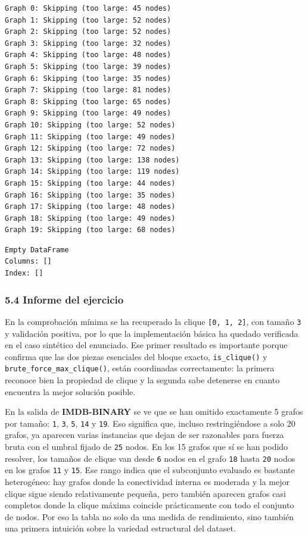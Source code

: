 \documentclass[11pt]{article}
\begin{document}
    \begin{Verbatim}[commandchars=\\\{\}]
Graph 0: Skipping (too large: 45 nodes)
Graph 1: Skipping (too large: 52 nodes)
Graph 2: Skipping (too large: 52 nodes)
Graph 3: Skipping (too large: 32 nodes)
Graph 4: Skipping (too large: 48 nodes)
Graph 5: Skipping (too large: 39 nodes)
Graph 6: Skipping (too large: 35 nodes)
Graph 7: Skipping (too large: 81 nodes)
Graph 8: Skipping (too large: 65 nodes)
Graph 9: Skipping (too large: 49 nodes)
Graph 10: Skipping (too large: 52 nodes)
Graph 11: Skipping (too large: 49 nodes)
Graph 12: Skipping (too large: 72 nodes)
Graph 13: Skipping (too large: 138 nodes)
Graph 14: Skipping (too large: 119 nodes)
Graph 15: Skipping (too large: 44 nodes)
Graph 16: Skipping (too large: 35 nodes)
Graph 17: Skipping (too large: 48 nodes)
Graph 18: Skipping (too large: 49 nodes)
Graph 19: Skipping (too large: 68 nodes)
    \end{Verbatim}

    
    \begin{Verbatim}[commandchars=\\\{\}]
Empty DataFrame
Columns: []
Index: []
    \end{Verbatim}

    
    \subsubsection{5.4 Informe del ejercicio}\label{informe-del-ejercicio}

En la comprobación mínima se ha recuperado la clique
\texttt{{[}0,\ 1,\ 2{]}}, con tamaño \texttt{3} y validación positiva,
por lo que la implementación básica ha quedado verificada en el caso
sintético del enunciado. Ese primer resultado es importante porque
confirma que las dos piezas esenciales del bloque exacto,
\texttt{is\_clique()} y \texttt{brute\_force\_max\_clique()}, están
coordinadas correctamente: la primera reconoce bien la propiedad de
clique y la segunda sabe detenerse en cuanto encuentra la mejor solución
posible.

En la salida de \textbf{IMDB-BINARY} se ve que se han omitido
exactamente 5 grafos por tamaño: \texttt{1}, \texttt{3}, \texttt{5},
\texttt{14} y \texttt{19}. Eso significa que, incluso restringiéndose a
solo 20 grafos, ya aparecen varias instancias que dejan de ser
razonables para fuerza bruta con el umbral fijado de \texttt{25} nodos.
En los 15 grafos que sí se han podido resolver, los tamaños de clique
van desde \texttt{6} nodos en el grafo \texttt{18} hasta \texttt{20}
nodos en los grafos \texttt{11} y \texttt{15}. Ese rango indica que el
subconjunto evaluado es bastante heterogéneo: hay grafos donde la
conectividad interna es moderada y la mejor clique sigue siendo
relativamente pequeña, pero también aparecen grafos casi completos donde
la clique máxima coincide prácticamente con todo el conjunto de nodos.
Por eso la tabla no solo da una medida de rendimiento, sino también una
primera intuición sobre la variedad estructural del dataset.
\end{document}
